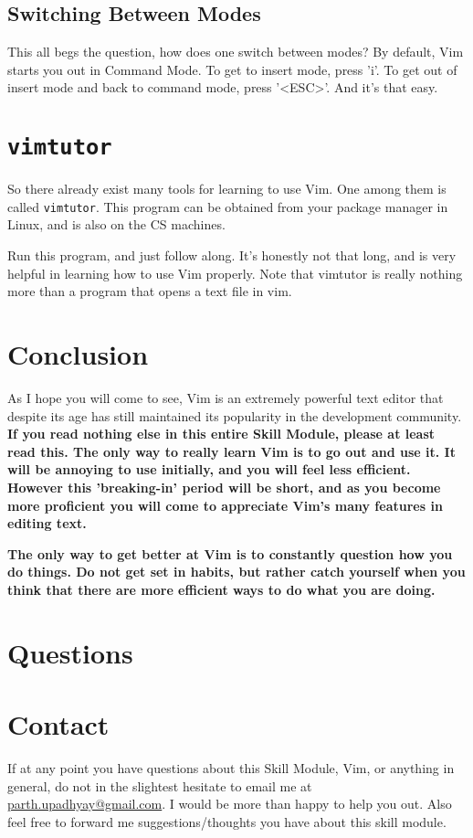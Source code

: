 \subsection{Switching Between Modes}
This all begs the question, how does one switch between modes? By default, Vim
starts you out in Command Mode. To get to insert mode, press 'i'. To get out of
insert mode and back to command mode, press '<ESC>'. And it's that easy.

\section{\texttt{vimtutor}}
So there already exist many tools for learning to use Vim. One among them is called
\texttt{vimtutor}. This program can be obtained from your package manager in Linux,
and is also on the CS machines.

Run this program, and just follow along. It's honestly not that long, and is very
helpful in learning how to use Vim properly. Note that vimtutor is really nothing
more than a program that opens a text file in vim.

\section{Conclusion}
As I hope you will come to see, Vim is an extremely powerful text editor that
despite its age has still maintained its popularity in the development
community. {\bf If you read nothing else in this entire Skill Module, please
at least read this. The only way to really learn Vim is to go out and use it.
It will be annoying to use initially, and you will feel less efficient. However
this 'breaking-in' period will be short, and as you become more proficient
you will come to appreciate Vim's many features in editing text.}

{\bf The only way to get better at Vim is to constantly question how you do 
things. Do not get set in habits, but rather catch yourself when you think
that there are more efficient ways to do what you are doing.}

\section{Questions}

\section{Contact}
If at any point you have questions about this Skill Module, Vim, or anything
in general, do not in the slightest hesitate to email me at 
\url{parth.upadhyay@gmail.com}. I would be more than happy to help you out.
Also feel free to forward me suggestions/thoughts you have about this skill module.



